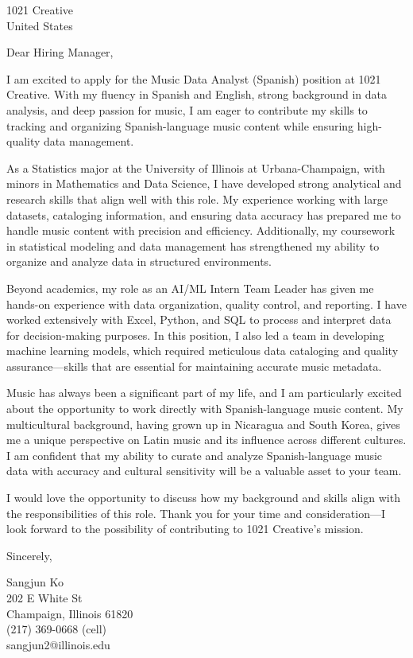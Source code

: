 \documentclass{letter}
\begin{document}
\begin{letter}{1021 Creative\\
    United States
    }


\opening{Dear Hiring Manager,}
I am excited to apply for the Music Data Analyst (Spanish) position at 1021 Creative. With my fluency in Spanish and English, strong background in data analysis, and deep passion for music, I am eager to contribute my skills to tracking and organizing Spanish-language music content while ensuring high-quality data management.

As a Statistics major at the University of Illinois at Urbana-Champaign, with minors in Mathematics and Data Science, I have developed strong analytical and research skills that align well with this role. My experience working with large datasets, cataloging information, and ensuring data accuracy has prepared me to handle music content with precision and efficiency. Additionally, my coursework in statistical modeling and data management has strengthened my ability to organize and analyze data in structured environments.

Beyond academics, my role as an AI/ML Intern Team Leader has given me hands-on experience with data organization, quality control, and reporting. I have worked extensively with Excel, Python, and SQL to process and interpret data for decision-making purposes. In this position, I also led a team in developing machine learning models, which required meticulous data cataloging and quality assurance—skills that are essential for maintaining accurate music metadata.

Music has always been a significant part of my life, and I am particularly excited about the opportunity to work directly with Spanish-language music content. My multicultural background, having grown up in Nicaragua and South Korea, gives me a unique perspective on Latin music and its influence across different cultures. I am confident that my ability to curate and analyze Spanish-language music data with accuracy and cultural sensitivity will be a valuable asset to your team.

I would love the opportunity to discuss how my background and skills align with the responsibilities of this role. Thank you for your time and consideration—I look forward to the possibility of contributing to 1021 Creative’s mission.


\closing{Sincerely,
}

Sangjun Ko\\
202 E White St\\
Champaign, Illinois 61820\\
(217) 369-0668 (cell)\\sangjun2@illinois.edu
\end{letter}
\end{document}
